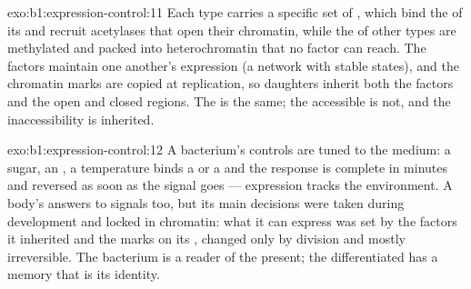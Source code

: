 \begin{solution}{exo:b1:expression-control:11}
Each  type carries a specific set of , which
bind the  of its  and recruit acetylases that open
their chromatin, while the  of other types are methylated and
packed into heterochromatin that no factor can reach. The factors
maintain one another's expression (a network with stable states), and
the chromatin marks are copied at replication, so daughters inherit
both the factors and the open and closed regions. The  is the
same; the accessible  is not, and the inaccessibility is
inherited.
\end{solution}

\begin{solution}{exo:b1:expression-control:12}
A bacterium's controls are tuned to the medium: a sugar, an , a temperature binds a  or a  and the
response is complete in minutes and reversed as soon as the signal
goes --- expression tracks the environment. A body's  answers to
signals too, but its main decisions were taken during development and
locked in chromatin: what it can express was set by the factors it
inherited and the marks on its , changed only by division and
mostly irreversible. The bacterium is a reader of the present; the
differentiated  has a memory that is its identity.
\end{solution}

